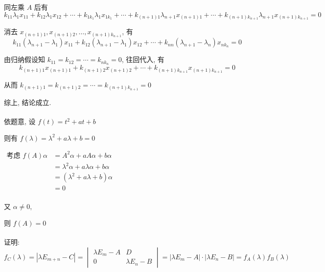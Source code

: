          同左乘 \( A \) 后有
         \[ k_{11}\lambda_{1}x_{11} + k_{12}\lambda_{1}x_{12} + \cdots + k_{1k_{1}}\lambda_{1}x_{1k_{1}} + \cdots + k_{(n+1)1}\lambda_{n+1}x_{(n+1)1} + \cdots + k_{(n+1)k_{n+1}}\lambda_{n+1}x_{(n+1)k_{n+1}} = 0 \]

         消去 \( x_{(n+1)1}, x_{(n+1)2}, \dots, x_{(n+1)k_{n+1}} \), 有
         \[ k_{11}(\lambda_{n+1} - \lambda_{1})x_{11} + k_{12}(\lambda_{n+1} - \lambda_{1})x_{12} + \cdots + k_{nn}(\lambda_{n+1} - \lambda_{n})x_{nk_{n}} = 0 \]

         由归纳假设知 \( k_{11} = k_{12} = \cdots = k_{n k_n} = 0 \), 往回代入, 有
         \[ k_{(n+1)1}x_{(n+1)1} + k_{(n+1)2}x_{(n+1)2} + \cdots + k_{(n+1)k_{n+1}}x_{(n+1)k_{n+1}} = 0 \]

         从而 \( k_{(n+1)1} = k_{(n+1)2} = \cdots = k_{(n+1)k_{n+1}} = 0 \)

         综上, 结论成立.


     \paragraph{} %
         依题意, 设 \( f(t) = t^{2} + at + b \)

         则有 \( f(\lambda) = \lambda^{2} + a\lambda + b = 0 \)

         \(\begin{aligned}
             \text{考虑 } f(A)\alpha & = A^{2}\alpha + aA\alpha + b\alpha             \\
                                   & = \lambda^{2}\alpha + a\lambda\alpha + b\alpha \\
                                   & = (\lambda^{2} + a\lambda + b)\alpha           \\
                                   & = 0                                            \\
         \end{aligned}\)

         又 \(\alpha \neq 0\),

         则 \( f(A) = 0 \)

     \paragraph{} %
         证明: \( f_{C}(\lambda) = |\lambda E_{m+n} - C| = \begin{vmatrix}
             \lambda E_{m} - A & D                 \\
             0                 & \lambda E_{n} - B
         \end{vmatrix} = |\lambda E_{m} - A|\cdot|\lambda E_{n} - B| = f_{A}(\lambda)f_{B}(\lambda) \)


